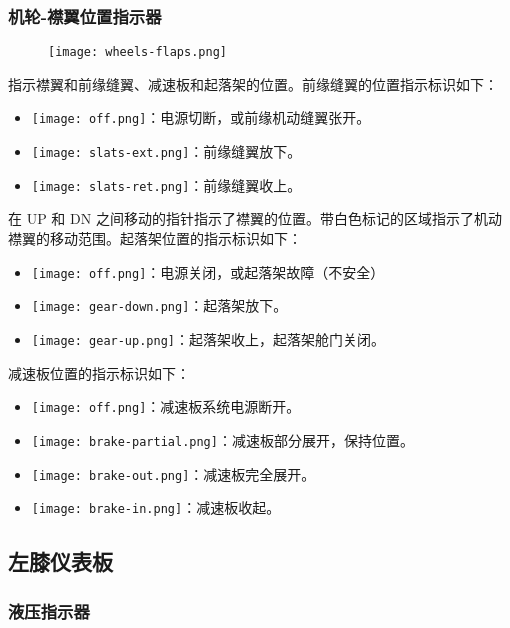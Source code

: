 \subsubsection{机轮-襟翼位置指示器}

\begin{figure}[htb]
  \center
  \texttt{[image: wheels-flaps.png]}
\end{figure}

指示襟翼和前缘缝翼、减速板和起落架的位置。前缘缝翼的位置指示标识如下：
\begin{itemize}
  \item \texttt{[image: off.png]}：电源切断，或前缘机动缝翼张开。
  \item \texttt{[image: slats-ext.png]}：前缘缝翼放下。
  \item \texttt{[image: slats-ret.png]}：前缘缝翼收上。
\end{itemize}

在 UP 和 DN 之间移动的指针指示了襟翼的位置。带白色标记的区域指示了机动襟翼的移动范围。起落架位置的指示标识如下：
\begin{itemize}
  \item \texttt{[image: off.png]}：电源关闭，或起落架故障（不安全）
  \item \texttt{[image: gear-down.png]}：起落架放下。
  \item \texttt{[image: gear-up.png]}：起落架收上，起落架舱门关闭。
\end{itemize}

减速板位置的指示标识如下：
\begin{itemize}
  \item \texttt{[image: off.png]}：减速板系统电源断开。
  \item \texttt{[image: brake-partial.png]}：减速板部分展开，保持位置。
  \item \texttt{[image: brake-out.png]}：减速板完全展开。
  \item \texttt{[image: brake-in.png]}：减速板收起。
\end{itemize}

\subsection{左膝仪表板}

\subsubsection{液压指示器}

